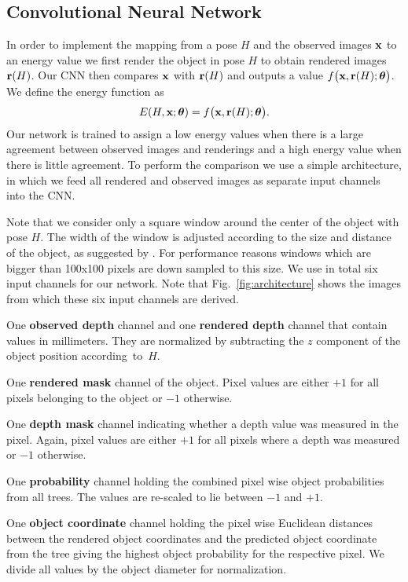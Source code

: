 \documentclass[10pt,letterpaper]{article}
\newcommand{\btheta}{\boldsymbol\theta}
\newcommand{\bx}{{\bf x}}
\begin{document}
\subsection{Convolutional Neural Network \label{sec:convnet}}
In order to implement the mapping from a pose $H$ and the observed images $\bf x$ to an energy value we first render the object in pose $H$ to obtain rendered images ${\bf r}(H)$. Our CNN then compares $\bf x$ with ${\bf r}(H)$ and outputs a value $f\big( \bx, {\bf r}(H) ; \btheta \big)$. We define the energy function as
\begin{equation} \label{eq:ourEnergy}
E(H,\bx;\btheta)=f\big( \bx, {\bf r}(H) ; \btheta \big).
\end{equation}
Our network is trained to assign a low energy values when there is a large agreement between observed images and renderings and a high energy value when there is little agreement.
To perform the comparison we use a simple architecture, in which we feed all rendered and observed images as separate input channels into the CNN. 

Note that we consider only a square window around the center of the object with pose $H$. The width of the window is adjusted according to the size and distance of the object, as suggested by \cite{brachmann2014}. For performance reasons windows which are bigger than 100x100 pixels are down sampled to this size. We use in total six input channels for our network. Note that Fig.~\ref{fig:architecture} shows the images from which these six input channels are derived. 

\noindent One {\bf observed depth} channel and one {\bf rendered depth} channel that contain values in millimeters. They are normalized by subtracting the $z$ component of the object position according~to~$H$.

\noindent One {\bf rendered mask} channel of the object. Pixel values are either $+1$ for all pixels belonging to the object or $-1$ otherwise.

\noindent One {\bf depth mask} channel indicating whether a depth value was measured in the pixel. Again, pixel values are either $+1$ for all pixels where a depth was measured or $-1$ otherwise.

\noindent One {\bf probability} channel holding the combined pixel wise object probabilities from all trees. The values are re-scaled to lie between $-1$ and $+1$. 

\noindent One {\bf object coordinate} channel holding the pixel wise Euclidean distances between the rendered object coordinates and the predicted object coordinate from the tree giving the highest object probability for the respective pixel. We divide all values by the object diameter for normalization.
\end{document}
